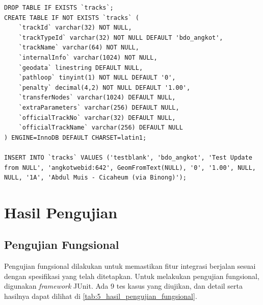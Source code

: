 \begin{lstlisting}
DROP TABLE IF EXISTS `tracks`;
CREATE TABLE IF NOT EXISTS `tracks` (
	`trackId` varchar(32) NOT NULL,
	`trackTypeId` varchar(32) NOT NULL DEFAULT 'bdo_angkot',
	`trackName` varchar(64) NOT NULL,
	`internalInfo` varchar(1024) NOT NULL,
	`geodata` linestring DEFAULT NULL,
	`pathloop` tinyint(1) NOT NULL DEFAULT '0',
	`penalty` decimal(4,2) NOT NULL DEFAULT '1.00',
	`transferNodes` varchar(1024) DEFAULT NULL,
	`extraParameters` varchar(256) DEFAULT NULL,
	`officialTrackNo` varchar(32) DEFAULT NULL,
	`officialTrackName` varchar(256) DEFAULT NULL
) ENGINE=InnoDB DEFAULT CHARSET=latin1;

INSERT INTO `tracks` VALUES ('testblank', 'bdo_angkot', 'Test Update from NULL', 'angkotwebid:642', GeomFromText(NULL), '0', '1.00', NULL, NULL, '1A', 'Abdul Muis - Cicaheum (via Binong)');
\end{lstlisting}

\section{Hasil Pengujian}

\subsection{Pengujian Fungsional}

Pengujian fungsional dilakukan untuk memastikan fitur integrasi berjalan sesuai dengan spesifikasi yang telah ditetapkan. Untuk melakukan pengujian fungsional, digunakan \textit{framework} JUnit\cite{junit}. Ada 9 tes kasus yang diujikan, dan detail serta hasilnya dapat dilihat di \ref{tab:5_hasil_pengujian_fungsional}.

